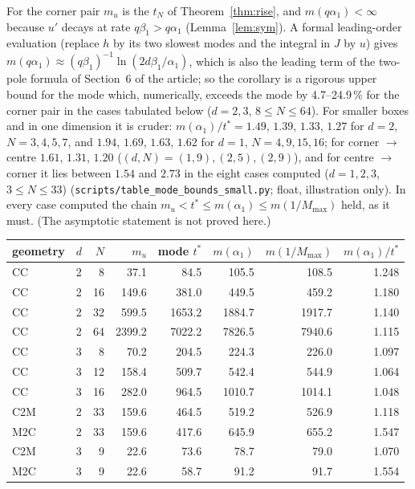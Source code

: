 \documentclass[11pt,a4paper]{article}
\theoremstyle{definition}
\begin{document}
For the corner pair $m_u$ is the $t_N$ of Theorem~\ref{thm:rise}, and $m(q\alpha_1)<\infty$ because $u'$ decays at rate $q\beta_1>q\alpha_1$ (Lemma~\ref{lem:sym}). A formal leading-order evaluation (replace $h$ by its two slowest modes and the integral in $J$ by $u$) gives $m(q\alpha_1)\approx(q\beta_1)^{-1}\ln(2d\beta_1/\alpha_1)$, which is also the leading term of the two-pole formula of Section~6 of the article; so the corollary is a rigorous upper bound for the mode which, numerically, exceeds the mode by 4.7--24.9\,\% for the corner pair in the cases tabulated below ($d=2,3$, $8\le N\le64$). For smaller boxes and in one dimension it is cruder: $m(\alpha_1)/t^*=1.49$, $1.39$, $1.33$, $1.27$ for $d=2$, $N=3,4,5,7$, and $1.94$, $1.69$, $1.63$, $1.62$ for $d=1$, $N=4,9,15,16$; for corner $\to$ centre $1.61$, $1.31$, $1.20$ ($(d,N)=(1,9),(2,5),(2,9)$), and for centre $\to$ corner it lies between $1.54$ and $2.73$ in the eight cases computed ($d=1,2,3$, $3\le N\le33$) (\texttt{scripts/table\_mode\_bounds\_small.py}; float, illustration only). In every case computed the chain $m_u<t^*\le m(\alpha_1)\le m(1/M_{\max})$ held, as it must. (The asymptotic statement is not proved here.)
\begin{center}\small
\begin{tabular}{llrrrrrr}\toprule
geometry&$d$&$N$&$m_u$&mode $t^*$&$m(\alpha_1)$&$m(1/M_{\max})$&$m(\alpha_1)/t^*$\\\midrule
CC&2&8&37.1&84.5&105.5&108.5&1.248\\
CC&2&16&149.6&381.0&449.5&459.2&1.180\\
CC&2&32&599.5&1653.2&1884.7&1917.7&1.140\\
CC&2&64&2399.2&7022.2&7826.5&7940.6&1.115\\
CC&3&8&70.2&204.5&224.3&226.0&1.097\\
CC&3&12&158.4&509.7&542.4&544.9&1.064\\
CC&3&16&282.0&964.5&1010.7&1014.1&1.048\\
C2M&2&33&159.6&464.5&519.2&526.9&1.118\\
M2C&2&33&159.6&417.6&645.9&655.2&1.547\\
C2M&3&9&22.6&73.6&78.7&79.0&1.070\\
M2C&3&9&22.6&58.7&91.2&91.7&1.554\\\bottomrule
\end{tabular}
\end{center}
\end{document}
